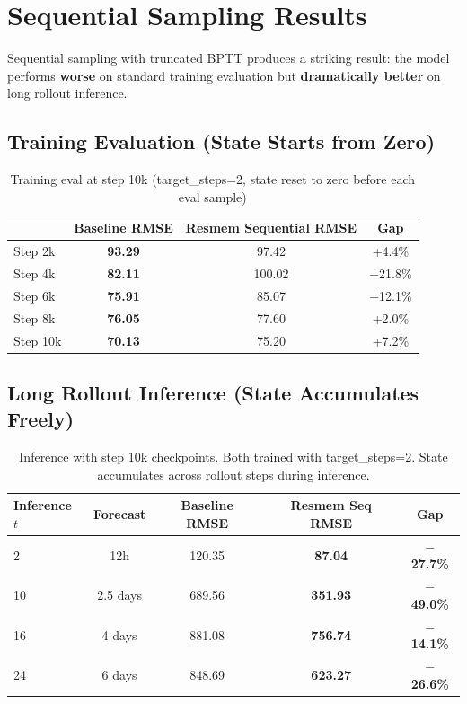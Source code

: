\documentclass[11pt,a4paper]{article}
\begin{document}
\section{Sequential Sampling Results}

Sequential sampling with truncated BPTT produces a striking result: the model performs \textbf{worse} on standard training evaluation but \textbf{dramatically better} on long rollout inference.

\subsection{Training Evaluation (State Starts from Zero)}

\begin{table}[H]
\centering
\caption{Training eval at step 10k (target\_steps=2, state reset to zero before each eval sample)}
\begin{tabular}{lccc}
\toprule
& Baseline RMSE & Resmem Sequential RMSE & Gap \\
\midrule
Step 2k & \textbf{93.29} & 97.42 & +4.4\% \\
Step 4k & \textbf{82.11} & 100.02 & +21.8\% \\
Step 6k & \textbf{75.91} & 85.07 & +12.1\% \\
Step 8k & \textbf{76.05} & 77.60 & +2.0\% \\
Step 10k & \textbf{70.13} & 75.20 & +7.2\% \\
\bottomrule
\end{tabular}
\end{table}

\subsection{Long Rollout Inference (State Accumulates Freely)}

\begin{table}[H]
\centering
\caption{Inference with step 10k checkpoints. Both trained with target\_steps=2. State accumulates across rollout steps during inference.}
\begin{tabular}{lcccc}
\toprule
Inference $t$ & Forecast & Baseline RMSE & Resmem Seq RMSE & Gap \\
\midrule
2 & 12h & 120.35 & \textbf{87.04} & \textbf{$-$27.7\%} \\
10 & 2.5 days & 689.56 & \textbf{351.93} & \textbf{$-$49.0\%} \\
16 & 4 days & 881.08 & \textbf{756.74} & \textbf{$-$14.1\%} \\
24 & 6 days & 848.69 & \textbf{623.27} & \textbf{$-$26.6\%} \\
\bottomrule
\end{tabular}
\end{table}
\end{document}
